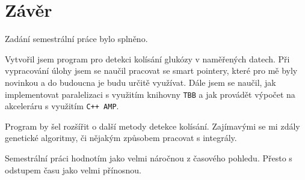 \documentclass{article}
\begin{document}
	\section{Závěr} %
	Zadání semestrální práce bylo splněno.
	
	Vytvořil jsem program pro detekci kolísání glukózy v naměřených datech.
	Při vypracování úlohy jsem se naučil pracovat se smart pointery, které pro mě byly novinkou a do budoucna je budu určitě využívat. Dále jsem se naučil, jak implementovat paralelizaci s využitím knihovny \texttt{TBB} a jak provádět výpočet na akceleráru s využitím \texttt{C++ AMP}.
	
	Program by šel rozšířit o další metody detekce kolísání. Zajímavými se mi zdály genetické algoritmy, či nějakým způsobem pracovat s integrály.
	
	Semestrální práci hodnotím jako velmi náročnou z časového pohledu. Přesto s odstupem času jako velmi přínosnou. 
\end{document}
